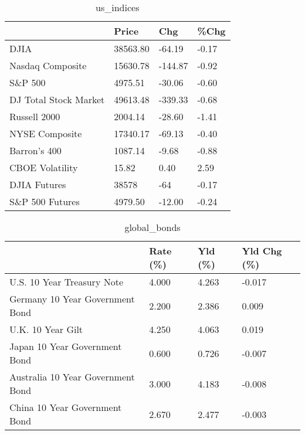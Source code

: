 \documentclass{article}%
\begin{document}
%


\begin{table}[htbp]%
\caption{us\_indices}%
\centering%
\begin{adjustbox}{width=1\textwidth}%
\begin{tabular}{llll}
\toprule
                      &    Price &     Chg &  \%Chg \\
\midrule
                 DJIA & 38563.80 &  -64.19 & -0.17 \\
     Nasdaq Composite & 15630.78 & -144.87 & -0.92 \\
              S\&P 500 &  4975.51 &  -30.06 & -0.60 \\
DJ Total Stock Market & 49613.48 & -339.33 & -0.68 \\
         Russell 2000 &  2004.14 &  -28.60 & -1.41 \\
       NYSE Composite & 17340.17 &  -69.13 & -0.40 \\
         Barron's 400 &  1087.14 &   -9.68 & -0.88 \\
      CBOE Volatility &    15.82 &    0.40 &  2.59 \\
         DJIA Futures &    38578 &     -64 & -0.17 \\
      S\&P 500 Futures &  4979.50 &  -12.00 & -0.24 \\
\bottomrule
\end{tabular}
%
\end{adjustbox}%
\end{table}

%


\begin{table}[htbp]%
\caption{global\_bonds}%
\centering%
\begin{adjustbox}{width=1\textwidth}%
\begin{tabular}{llll}
\toprule
                                  & Rate (\%) & Yld (\%) & Yld Chg (\%) \\
\midrule
       U.S. 10 Year Treasury Note &    4.000 &   4.263 &      -0.017 \\
  Germany 10 Year Government Bond &    2.200 &   2.386 &       0.009 \\
                U.K. 10 Year Gilt &    4.250 &   4.063 &       0.019 \\
    Japan 10 Year Government Bond &    0.600 &   0.726 &      -0.007 \\
Australia 10 Year Government Bond &    3.000 &   4.183 &      -0.008 \\
    China 10 Year Government Bond &    2.670 &   2.477 &      -0.003 \\
\bottomrule
\end{tabular}
%
\end{adjustbox}%
\end{table}
\end{document}
